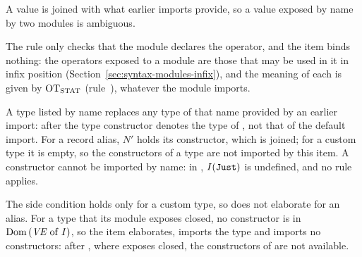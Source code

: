 




\begin{rulecomments}
 A value is joined with what earlier imports provide,
so a value exposed by name by two modules is ambiguous. %

 The rule only checks that the module declares the
operator, and the item binds nothing: the operators exposed to a module are
those that may be used in it in infix position
(Section~\ref{sec:syntax-modules-infix}), and the meaning of each is given by
$\mathrm{OT}_{\mathrm{STAT}}$ (rule~), whatever the module imports.

 A type listed by name replaces any type of that name
provided by an earlier import: after  the
type constructor  denotes the type of , not that of the
default import. %
For a record alias, $N'$ holds its constructor, which is joined; for a custom
type it is empty, so the constructors of a type are not imported by this item.
A constructor cannot be imported by name: in ,
$I(\textnormal{\texttt{Just}})$ is undefined, and no rule applies.

 The side condition holds only for a custom type,
so  does not elaborate for an alias. For a type that its module
exposes closed, no constructor is in $\mathrm{Dom}\,(\mathit{VE} \mathrel{\mathrm{of}} I)$, so the item
elaborates, imports the type and imports no constructors: after
, where  exposes  closed, the
constructors of  are not available.
\end{rulecomments}


